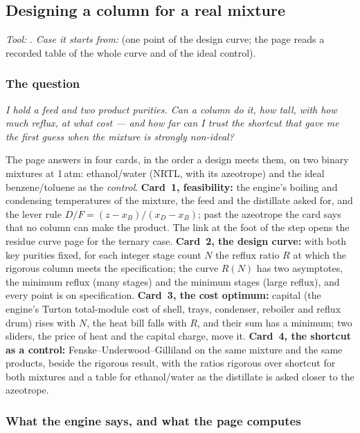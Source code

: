 \documentclass[11pt,a4paper]{article}
\begin{document}
\subsection{Designing a column for a real mixture}\label{sec:edu-column-design}

\noindent\textit{\small Tool:} .  \textit{\small
Case it starts from:} 
(one point of the design curve; the page reads a recorded table of the whole
curve and of the ideal control).

\subsubsection*{The question}

\emph{I hold a feed and two product purities.  Can a column do it, how tall,
with how much reflux, at what cost --- and how far can I trust the shortcut
that gave me the first guess when the mixture is strongly non-ideal?}

The page answers in four cards, in the order a design meets them, on two binary
mixtures at 1\,atm: ethanol/water (NRTL, with its azeotrope) and the ideal
benzene/toluene as the \emph{control}.  \textbf{Card~1, feasibility:} the
engine's boiling and condensing temperatures of the mixture, the feed and the
distillate asked for, and the lever rule $D/F=(z-x_B)/(x_D-x_B)$; past the
azeotrope the card says that no column can make the product.  The link at the
foot of the step opens the residue curve page for the ternary case.
\textbf{Card~2, the design curve:} with both key purities fixed, for each
integer stage count $N$ the reflux ratio $R$ at which the rigorous column meets
the specification; the curve $R(N)$ has two asymptotes, the minimum reflux (many
stages) and the minimum stages (large reflux), and every point is on
specification.  \textbf{Card~3, the cost optimum:} capital (the engine's Turton
total-module cost of shell, trays, condenser, reboiler and reflux drum) rises
with $N$, the heat bill falls with $R$, and their sum has a minimum; two
sliders, the price of heat and the capital charge, move it.  \textbf{Card~4, the
shortcut as a control:} Fenske--Underwood--Gilliland on the same mixture and the
same products, beside the rigorous result, with the ratios rigorous over
shortcut for both mixtures and a table for ethanol/water as the distillate is
asked closer to the azeotrope.

\subsubsection*{What the engine says, and what the page computes}
\end{document}
